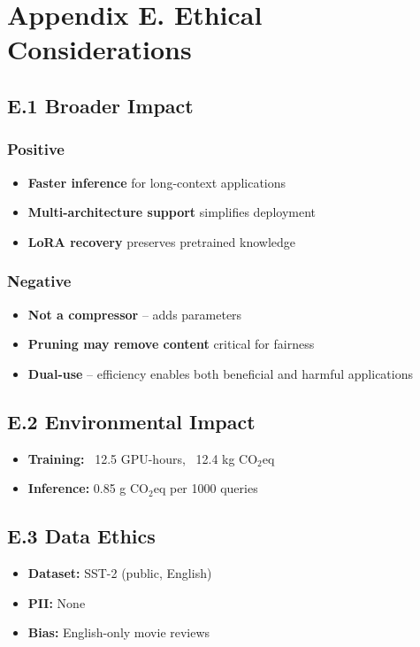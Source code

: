 
\section{Appendix E. Ethical Considerations}

\subsection{E.1 Broader Impact}

\subsubsection{Positive}
\begin{itemize}
\item \textbf{Faster inference} for long-context applications
\item \textbf{Multi-architecture support} simplifies deployment
\item \textbf{LoRA recovery} preserves pretrained knowledge

\end{itemize}
\subsubsection{Negative}
\begin{itemize}
\item \textbf{Not a compressor} -- adds parameters
\item \textbf{Pruning may remove content} critical for fairness
\item \textbf{Dual-use} -- efficiency enables both beneficial and harmful applications

\end{itemize}
\subsection{E.2 Environmental Impact}

\begin{itemize}
\item \textbf{Training:} ~12.5 GPU-hours, ~12.4 kg CO$_2$eq
\item \textbf{Inference:} 0.85 g CO$_2$eq per 1000 queries

\end{itemize}
\subsection{E.3 Data Ethics}

\begin{itemize}
\item \textbf{Dataset:} SST-2 (public, English)
\item \textbf{PII:} None
\item \textbf{Bias:} English-only movie reviews

\end{itemize}
